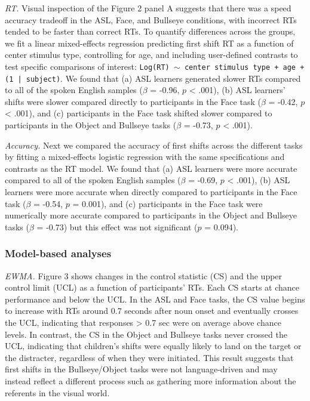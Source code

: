 \documentclass[10pt, letterpaper]{article}
\begin{document}
\emph{RT.} Visual inspection of the Figure 2 panel A suggests that there
was a speed accuracy tradeoff in the ASL, Face, and Bullseye conditions,
with incorrect RTs tended to be faster than correct RTs. To quantify
differences across the groups, we fit a linear mixed-effects regression
predicting first shift RT as a function of center stimulus type,
controlling for age, and including user-defined contrasts to test
specific comparisons of interest:
\texttt{Log(RT) $\sim$ center stimulus type + age +  (1 | subject)}. We
found that (a) ASL learners generated slower RTs compared to all of the
spoken English samples (\(\beta\) = -0.96, \(p\) \textless{} .001), (b)
ASL learners' shifts were slower compared directly to participants in
the Face task (\(\beta\) = -0.42, \(p\) \textless{} .001), and (c)
participants in the Face task shifted slower compared to participants in
the Object and Bullseye tasks (\(\beta\) = -0.73, \(p\) \textless{}
.001).

\emph{Accuracy.} Next we compared the accuracy of first shifts across
the different tasks by fitting a mixed-effects logistic regression with
the same specifications and contrasts as the RT model. We found that (a)
ASL learners were more accurate compared to all of the spoken English
samples (\(\beta\) = -0.69, \(p\) \textless{} .001), (b) ASL learners
were more accurate when directly compared to participants in the Face
task (\(\beta\) = -0.54, \(p\) = 0.001), and (c) participants in the
Face task were numerically more accurate compared to participants in the
Object and Bullseye tasks (\(\beta\) = -0.73) but this effect was not
significant (\(p\) = 0.094).

\subsubsection{Model-based analyses}\label{model-based-analyses}

\emph{EWMA.} Figure 3 shows changes in the control statistic (CS) and
the upper control limit (UCL) as a function of participants' RTs. Each
CS starts at chance performance and below the UCL. In the ASL and Face
tasks, the CS value begins to increase with RTs around 0.7 seconds after
noun onset and eventually crosses the UCL, indicating that responses
\textgreater{} 0.7 sec were on average above chance levels. In contrast,
the CS in the Object and Bullseye tasks never crossed the UCL,
indicating that children's shifts were equally likely to land on the
target or the distracter, regardless of when they were initiated. This
result suggests that first shifts in the Bullseye/Object tasks were not
language-driven and may instead reflect a different process such as
gathering more information about the referents in the visual world.
\end{document}
